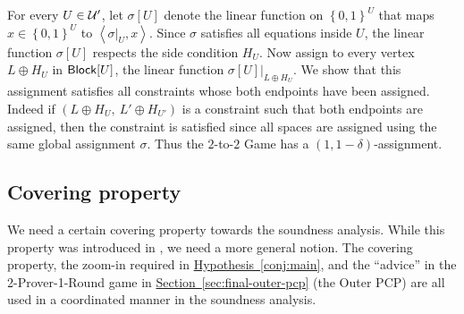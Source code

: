 \documentclass[11pt]{article}
\numberwithin{equation}{section}
\theoremstyle{definition}
\theoremstyle{plain}
\newcommand{\expref}[2]{\hyperref[#2]{#1~\ref{#2}}}
\newcommand\set[1]{{\left\{ #1 \right\}}}
\newcommand\power[1]{\set{0,1}^{#1}}
\newcommand*\xor{\mathbin{\oplus}}
\begin{document}
%
For every $U \in {\cal U}'$, let $\sigma[U]$ denote the linear function on $\power{U}$ that maps $x \in \power{U}$ to $\left< \sigma|_U, x \right>$.
Since $\sigma$ satisfies all equations inside $U$, the linear function $\sigma[U]$ respects the side condition $H_U$. Now assign to every vertex
$L\xor H_U$ in ${\sf Block}[U]$, the linear function $\sigma[U]|_{L\xor H_U}$. We show that this assignment satisfies all constraints whose
both endpoints have been assigned.
Indeed if $(L\xor H_U, ~L'\xor H_{U'})$ is a constraint such that both endpoints are assigned,
then the constraint  is satisfied since all spaces are assigned using the same global assignment $\sigma$. Thus the $2$-to-$2$ Game has a
$(1, 1-\delta)$-assignment.


\subsection{Covering property}\label{section:covering}

We need a certain covering property towards the soundness analysis. While this property was introduced in \cite{KS}, we need a more general notion.
The covering property, the zoom-in required in \expref{Hypothesis}{conj:main}, and the ``advice'' in the 2-Prover-1-Round game in \expref{Section}{sec:final-outer-pcp} (the Outer PCP) are all used in a coordinated  manner in the soundness analysis.
\end{document}
